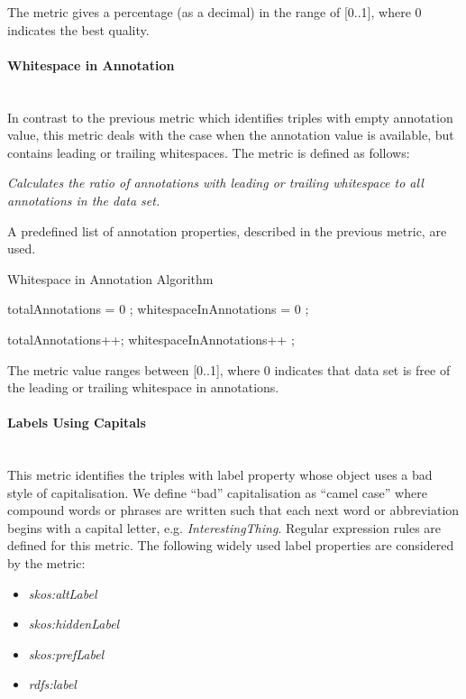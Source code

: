 The metric gives a percentage (as a decimal) in the range of [0..1], where 0 indicates the best quality.

\paragraph{Whitespace in Annotation}~\\
In contrast to the previous metric which identifies triples with empty annotation value, this metric deals with the case when the annotation value is available, but contains leading or trailing whitespaces.
The metric is defined as follows:

\begin{mdframed}[style=metricdefinition]
\emph{Calculates the ratio of annotations with leading or trailing whitespace to all annotations in the data set.}
\end{mdframed}

A predefined list of annotation properties, described in the previous metric, are used. 

\begin{algorithm}
\caption{Whitespace in Annotation Algorithm}\label{lst:whitespace}
\begin{algorithmic}[1]
\State totalAnnotations = 0 ;
\State whitespaceInAnnotations = 0 ;
\EndProcedure

 totalAnnotations++; \EndIf
{} whitespaceInAnnotations++ ; \EndIf
{}
\EndProcedure
\end{algorithmic}
\end{algorithm}

The metric value ranges between [0..1], where  0 indicates that data set is free of the leading or trailing whitespace in annotations.

\paragraph{Labels Using Capitals}~\\
This metric identifies the triples with label property whose object uses a bad style of capitalisation. 
We define ``bad'' capitalisation as ``camel case'' where compound words or phrases  are written such that each next word or abbreviation begins with a capital letter, e.g. \textit{InterestingThing}.
Regular expression rules are defined for this metric.
The following widely used label properties are considered by the metric:
\begin{itemize}
\item \textit{skos:altLabel}
\item \textit{skos:hiddenLabel}
\item \textit{skos:prefLabel}
\item \textit{rdfs:label}
\end{itemize}

